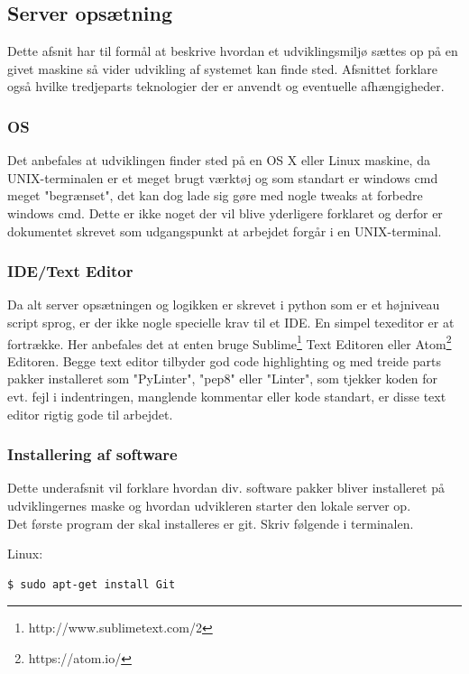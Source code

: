 \subsection{Server opsætning}
Dette afsnit har til formål at beskrive hvordan et udviklingsmiljø sættes op på en givet maskine så vider udvikling af systemet kan finde sted. Afsnittet forklare også hvilke tredjeparts teknologier der er anvendt og eventuelle afhængigheder.

\subsubsection{OS}
Det anbefales at udviklingen finder sted på en OS X eller Linux maskine, da UNIX-terminalen er et meget brugt værktøj og som standart er windows cmd meget "begrænset", det kan dog lade sig gøre med nogle tweaks at forbedre windows cmd. Dette er ikke noget der vil blive yderligere forklaret og derfor er dokumentet skrevet som udgangspunkt at arbejdet forgår i en UNIX-terminal.

\subsubsection{IDE/Text Editor}
Da alt server opsætningen og logikken er skrevet i python som er et højniveau script sprog, er der ikke nogle specielle krav til et IDE. En simpel texeditor er at fortrække. Her anbefales det at enten bruge Sublime\footnote{http://www.sublimetext.com/2} Text Editoren eller Atom\footnote{https://atom.io/} Editoren. Begge text editor tilbyder god code highlighting og med treide parts pakker installeret som "PyLinter", "pep8" eller "Linter", som tjekker koden for evt. fejl i indentringen, manglende kommentar eller kode standart, er disse text editor rigtig gode til arbejdet.

\subsubsection{Installering af software}
Dette underafsnit vil forklare hvordan div. software pakker bliver installeret på udviklingernes maske og hvordan udvikleren starter den lokale server op. \\
Det første program der skal installeres er git. Skriv følgende i terminalen.

Linux:
\begin{lstlisting}[language=bash]
	$ sudo apt-get install Git
\end{lstlisting}

